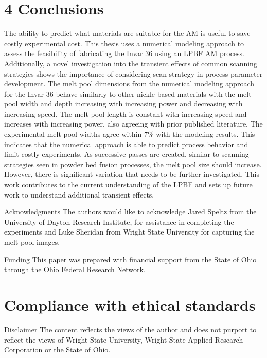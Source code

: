 \documentclass[10pt]{article}
\begin{document}
\section*{4 Conclusions}
The ability to predict what materials are suitable for the AM is useful to save costly experimental cost. This thesis uses a numerical modeling approach to assess the feasibility of fabricating the Invar 36 using an LPBF AM process. Additionally, a novel investigation into the transient effects of common scanning strategies shows the importance of considering scan strategy in process parameter development. The melt pool dimensions from the numerical modeling approach for the Invar 36 behave similarly to other nickle-based materials with the melt pool width and depth increasing with increasing power and decreasing with increasing speed. The melt pool length is constant with increasing speed and increases with increasing power, also agreeing with prior published literature. The experimental melt pool widths agree within $7 \%$ with the modeling results. This indicates that the numerical approach is able to predict process behavior and limit costly experiments. As successive passes are created, similar to scanning strategies seen in powder bed fusion processes, the melt pool size should increase. However, there is significant variation that needs to be further investigated. This work contributes to the current understanding of the LPBF and sets up future work to understand additional transient effects.

Acknowledgments The authors would like to acknowledge Jared Speltz from the University of Dayton Research Institute, for assistance in completing the experiments and Luke Sheridan from Wright State University for capturing the melt pool images.

Funding This paper was prepared with financial support from the State of Ohio through the Ohio Federal Research Network.

\section*{Compliance with ethical standards}
Disclaimer The content reflects the views of the author and does not purport to reflect the views of Wright State University, Wright State Applied Research Corporation or the State of Ohio.
\end{document}

